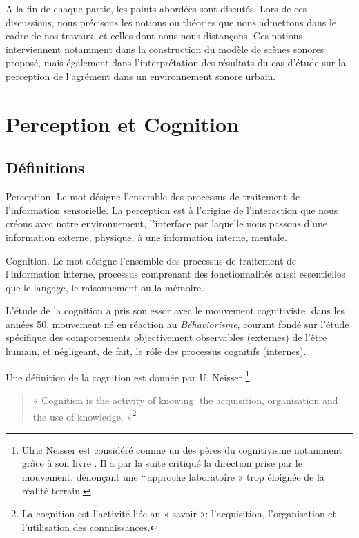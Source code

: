 A la fin de chaque partie, les points abordées sont discutés. Lors de ces discussions, nous précisons les notions ou théories que nous admettons dans le cadre de nos travaux, et celles dont nous nous distançons. Ces notions interviennent notamment dans la construction du modèle de scènes sonores proposé, mais également dans l'interprétation des résultats du cas d'étude sur la perception de l'agrément dans un environnement sonore urbain.

\section{Perception et Cognition}
\label{sec:ch3_perceptionCognition}

\subsection{Définitions}
\label{sec:ch3_perceptionCognitionDef}


Perception. Le mot désigne l'ensemble des processus de traitement de l'information sensorielle. La perception est à l'origine de l'interaction que nous créons avec notre environnement, l'interface par laquelle nous passons d'une information externe, physique, à une information interne, mentale.

Cognition. Le mot désigne l'ensemble des processus de traitement de l'information interne, processus comprenant des fonctionnalités aussi essentielles que le langage, le raisonnement ou la mémoire.

L'étude de la cognition a pris son essor avec le mouvement cognitiviste, dans les années 50, mouvement né en réaction au \emph{Béhaviorisme}, courant fondé sur l'étude spécifique des comportements objectivement observables (externes) de l'être humain, et négligeant, de fait, le rôle des processus cognitifs (internes).

Une définition de la cognition est donnée par U. Neisser \citep[p. 1]{neisser1976cognition}\footnote{Ulric Neisser est considéré comme un des pères du cognitivisme notamment grâce à son livre \citep{neisser1967cognitive}. Il a par la suite critiqué la direction prise par le mouvement, dénonçant une ``\,approche laboratoire » trop éloignée de la réalité terrain.}

\begin{quote}
\item « Cognition is the activity of knowing: the acquisition, organisation and the use of knowledge. »\footnote{La cognition est l'activité liée au « savoir »: l'acquisition, l'organisation et l'utilisation des connaissances.}
\end{quote}

